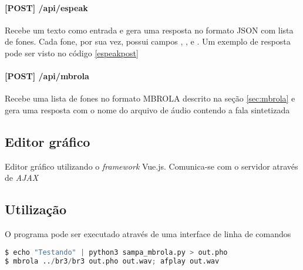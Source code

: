 \paragraph{[POST] /api/espeak} Recebe um texto como entrada e gera uma resposta
no formato JSON com lista de fones. Cada fone, por sua vez, possui campos ,
,  e . Um exemplo de resposta pode ser visto no código \ref{espeakpost}
\paragraph{[POST] /api/mbrola} Recebe uma lista de fones no formato MBROLA
descrito na seção \ref{sec:mbrola} e gera uma resposta com o nome do arquivo de
áudio contendo a fala sintetizada

\subsection{Editor gráfico}
Editor gráfico utilizando o \emph{framework} Vue.js. Comunica-se com o servidor
através de \emph{AJAX}

\subsection{Utilização}
O programa pode ser executado através de uma interface de linha de comandos

\begin{lstlisting}[caption=Utilização por linha de comandos, label=cmdline, language=Python]
$ echo "Testando" | python3 sampa_mbrola.py > out.pho
$ mbrola ../br3/br3 out.pho out.wav; afplay out.wav
\end{lstlisting}

